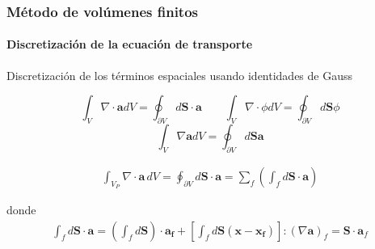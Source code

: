 \begin{frame}
    \frametitle{M\'etodo de vol\'umenes finitos}
    \framesubtitle{Discretizaci\'on de la ecuaci\'on de transporte}

    Discretizaci\'on de los t\'erminos espaciales usando identidades de Gauss

    $$ \int_V \nabla \cdot \boldsymbol{a} dV = \oint_{\partial V} d\boldsymbol{S} \cdot \boldsymbol{a}    \qquad   \int_V \nabla \cdot \phi dV = \oint_{\partial V} d\boldsymbol{S} \phi$$
    $$ \int_V \nabla \boldsymbol{a} dV = \oint_{\partial V} d\boldsymbol{S} \boldsymbol{a}  $$    
    
    \begin{align*}
      \int_{V_P} \nabla \cdot \boldsymbol{a}\,dV = \oint_{\partial V} d\boldsymbol{S} \cdot \boldsymbol{a} = \sum_f \left( \int_f d\boldsymbol{S} \cdot \boldsymbol{a} \right)
    \end{align*}

    donde
    \begin{align*}
       \int_f d\boldsymbol{S} \cdot \boldsymbol{a} = \left (  \int_f d\boldsymbol{S} \right ) \cdot \boldsymbol{a_f} + \left [  \int_f d\boldsymbol{S}(\boldsymbol{x} - \boldsymbol{x_f}) \right ] : (\nabla \boldsymbol{a})_f = \boldsymbol{S} \cdot \boldsymbol{a}_f
    \end{align*}
                                                

\end{frame}   












